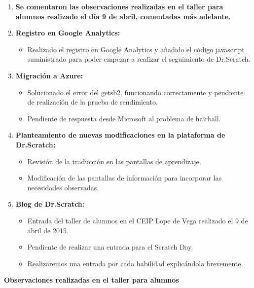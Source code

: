 \documentclass[a4paper,12pt]{letter}
\begin{document}
\begin{letter}
\begin{enumerate}
    
    \item{\textbf {Se comentaron las observaciones realizadas en el taller para alumnos realizado el día 9 de abril, comentadas más adelante.}}
    
    \item{\textbf {Registro en Google Analytics:}}
    \begin{itemize}
            \item {Realizado el registro en Google Analytics y añadido el código javascript suministrado para poder empezar a realizar el seguimiento de Dr.Scratch.}
    \end{itemize}

    \item{\textbf {Migración a Azure:}}
    \begin{itemize}
        \item {Solucionado el error del getsb2, funcionando correctamente y pendiente de realización de la prueba de rendimiento.}
        \item {Pendiente de respuesta desde Microsoft al problema de hairball.}
    \end{itemize}

	\item{\textbf {Planteamiento de nuevas modificaciones en la plataforma de Dr.Scratch:}}
    \begin{itemize}
        \item {Revisión de la traducción en las pantallas de aprendizaje.}
        \item {Modificación de las pantallas de información para incorporar las necesidades observadas.}
    \end{itemize}

    \item{\textbf {Blog de Dr.Scratch:}}
    \begin{itemize}
        \item {Entrada del taller de alumnos en el CEIP Lope de Vega realizado el 9 de abril de 2015.}
        \item {Pendiente de realizar una entrada para el Scratch Day.}
        \item {Realizaremos una entrada por cada habilidad explicándola brevemente.}
    \end{itemize}

\end{enumerate}

\vspace{2cm}
\textbf{{\LARGE Observaciones realizadas en el taller para alumnos}}
\vspace{0.5cm}



\end{letter}
\end{document}
